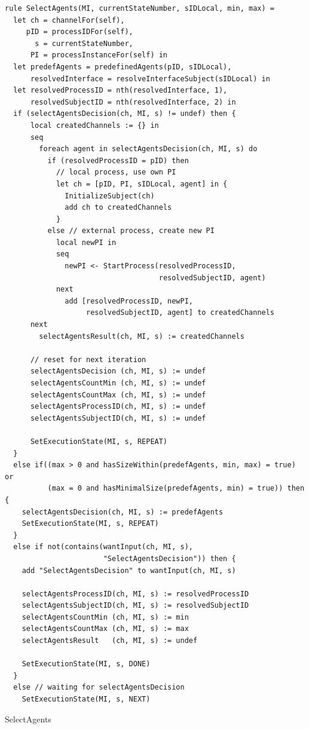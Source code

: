 \begin{listing}[H]
\begin{verbatim}
rule SelectAgents(MI, currentStateNumber, sIDLocal, min, max) =
  let ch = channelFor(self),
     pID = processIDFor(self),
       s = currentStateNumber,
      PI = processInstanceFor(self) in
  let predefAgents = predefinedAgents(pID, sIDLocal),
      resolvedInterface = resolveInterfaceSubject(sIDLocal) in
  let resolvedProcessID = nth(resolvedInterface, 1),
      resolvedSubjectID = nth(resolvedInterface, 2) in
  if (selectAgentsDecision(ch, MI, s) != undef) then {
      local createdChannels := {} in
      seq
        foreach agent in selectAgentsDecision(ch, MI, s) do
          if (resolvedProcessID = pID) then
            // local process, use own PI
            let ch = [pID, PI, sIDLocal, agent] in {
              InitializeSubject(ch)
              add ch to createdChannels
            }
          else // external process, create new PI
            local newPI in
            seq
              newPI <- StartProcess(resolvedProcessID,
                                    resolvedSubjectID, agent)
            next
              add [resolvedProcessID, newPI,
                   resolvedSubjectID, agent] to createdChannels
      next
        selectAgentsResult(ch, MI, s) := createdChannels

      // reset for next iteration
      selectAgentsDecision (ch, MI, s) := undef
      selectAgentsCountMin (ch, MI, s) := undef
      selectAgentsCountMax (ch, MI, s) := undef
      selectAgentsProcessID(ch, MI, s) := undef
      selectAgentsSubjectID(ch, MI, s) := undef

      SetExecutionState(MI, s, REPEAT)
  }
  else if((max > 0 and hasSizeWithin(predefAgents, min, max) = true) or
          (max = 0 and hasMinimalSize(predefAgents, min) = true)) then {
    selectAgentsDecision(ch, MI, s) := predefAgents
    SetExecutionState(MI, s, REPEAT)
  }
  else if not(contains(wantInput(ch, MI, s),
                       "SelectAgentsDecision")) then {
    add "SelectAgentsDecision" to wantInput(ch, MI, s)

    selectAgentsProcessID(ch, MI, s) := resolvedProcessID
    selectAgentsSubjectID(ch, MI, s) := resolvedSubjectID
    selectAgentsCountMin (ch, MI, s) := min
    selectAgentsCountMax (ch, MI, s) := max
    selectAgentsResult   (ch, MI, s) := undef

    SetExecutionState(MI, s, DONE)
  }
  else // waiting for selectAgentsDecision
    SetExecutionState(MI, s, NEXT)
\end{verbatim}
\caption{SelectAgents}
\label{lst:asm:SelectAgents}
\end{listing}

\normalsize
\captionsetup{font=normalsize}
